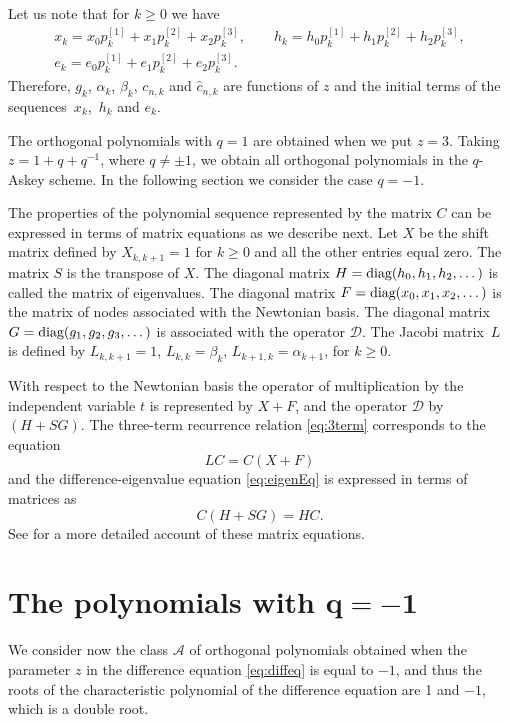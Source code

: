 \documentclass[pdftex]{sigma}
\def\cA{\mathcal A}
\def\cD{\mathcal D}
\def\diag{\hbox{diag}}
\numberwithin{equation}{section}
\begin{document}
Let us note that for $k \ge 0$ we have
\begin{gather*}%
	x_k = x_0 p^{[1]}_k + x_1 p^{[2]}_k + x_2 p^{[3]}_k, \qquad
	h_k = h_0 p^{[1]}_k + h_1 p^{[2]}_k + h_2 p^{[3]}_k, \\
	e_k = e_0 p^{[1]}_k + e_1 p^{[2]}_k + e_2 p^{[3]}_k.
\end{gather*}
Therefore, $g_k$, $\alpha_k$, $\beta_k$, $c_{n,k}$ and ${\hat c}_{n,k}$ are functions of $z$ and the initial terms of the sequences~$x_k$,~$h_k$ and $e_k$.

The orthogonal polynomials with $q=1$ are obtained when we put $z=3$.
Taking $z=1+ q+q^{-1}$, where $q\ne \pm 1$, we obtain all orthogonal polynomials in the $q$-Askey scheme. In the following section we consider the case $q=-1$.

The properties of the polynomial sequence represented by the matrix $C$ can be expressed in terms of matrix equations as we describe next.
Let $X$ be the shift matrix defined by $X_{k,k+1}=1$ for $k\ge 0$ and all the other entries equal zero.
 The matrix $S$ is the transpose of $X$. The diagonal matrix $H=\diag(h_0,h_1,h_2,\dots)$ is called the matrix of eigenvalues. The diagonal matrix $F=\diag(x_0,x_1,x_2,\dots)$ is the matrix of nodes associated with the Newtonian basis. The diagonal matrix $G=\diag(g_1,g_2,g_3,\dots)$ is associated with the operator $\cD$. The Jacobi matrix~$L$ is defined by $L_{k,k+1}=1$, $L_{k,k}=\beta_k$, $L_{k+1,k}=\alpha_{k+1}$, for $k\ge 0$.

 With respect to the Newtonian basis the operator of multiplication by the independent variable $t$ is represented by $ X+F$, and the operator $\cD$ by $( H + S G)$.
 The three-term recurrence relation \eqref{eq:3term} corresponds to the equation
 \begin{equation*}%
	 LC=C(X+F)
 \end{equation*}
and the difference-eigenvalue equation \eqref{eq:eigenEq} is expressed in terms of matrices as
\begin{equation*}%
	C(H+SG)=HC.
\end{equation*}
See \cite{Uni} for a more detailed account of these matrix equations.

\section[The polynomials with q=-1]{The polynomials with $\boldsymbol{q=-1}$}\label{section3}

We consider now the class $\cA$ of orthogonal polynomials obtained when the parameter $z$ in the difference equation \eqref{eq:diffeq} is equal to $-1$, and thus the roots of the characteristic polynomial of the difference equation are 1 and $-1$, which is a double root.
\end{document}
